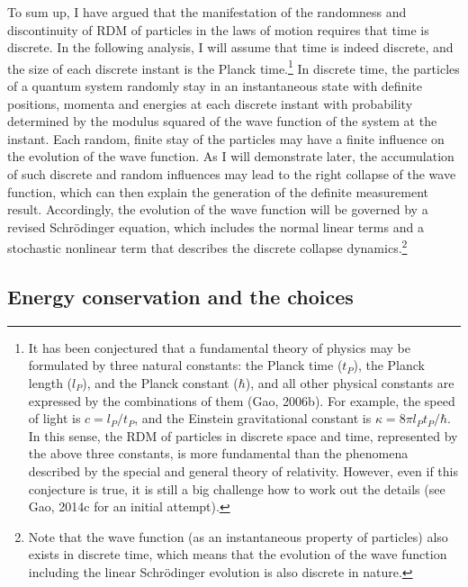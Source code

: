 To sum up, I have argued that the manifestation of the randomness and discontinuity of RDM of particles in the laws of motion requires that time is discrete. In the following analysis, I will assume that time is indeed discrete, and the size of each discrete instant is the Planck time.\footnote{It has been conjectured that a fundamental theory of physics may be formulated by three natural constants: the Planck time ($t_P$), the Planck length ($l_P$), and the Planck constant ($\hbar$), and all other physical constants are expressed by the combinations of them (Gao, 2006b). For example, the speed of light is $c=l_P/t_P$, and the Einstein gravitational constant is $\kappa = 8\pi l_P t_P /\hbar $. In this sense, the RDM of particles in discrete space and time, represented by the above three constants, is more fundamental than the phenomena described by the special and general theory of relativity. However, even if this conjecture is true, it is still a big challenge how to work out the details (see Gao, 2014c for an initial attempt).} In discrete time, the particles of a quantum system randomly stay in an instantaneous state with definite positions, momenta and energies at each discrete instant with probability determined by the modulus squared of the wave function of the system at the instant. Each random, finite stay of the particles may have a finite influence on the evolution of the wave function. As I will demonstrate later, the accumulation of such discrete and random influences may lead to the right collapse of the wave function, which can then explain the generation of the definite measurement result. Accordingly, the evolution of the wave function will be governed by a revised Schr\"{o}dinger equation, which includes the normal linear terms and a stochastic nonlinear term that describes the discrete collapse dynamics.\footnote{Note that the wave function (as an instantaneous property of particles) also exists in discrete time, which means that the evolution of the wave function including the linear Schr\"{o}dinger evolution is also discrete in nature.}

\subsection{Energy conservation and the choices}

